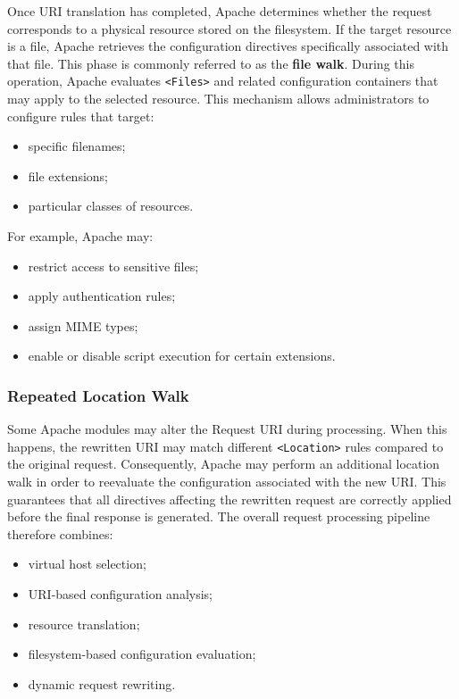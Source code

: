 \documentclass{scrbook}
\begin{document}
	Once URI translation has completed, Apache determines whether the request corresponds to a physical resource stored on the filesystem. If the target resource is a file, Apache retrieves the configuration directives specifically associated with that file. This phase is commonly referred to as the \textbf{file walk}. During this operation, Apache evaluates \texttt{<Files>} and related configuration containers that may apply to the selected resource. This mechanism allows administrators to configure rules that target:
	\begin{itemize}
		\item
		specific filenames;
		
		\item
		file extensions;
		
		\item
		particular classes of resources.
	\end{itemize}
	
	For example, Apache may:
	\begin{itemize}
		\item
		restrict access to sensitive files;
		
		\item
		apply authentication rules;
		
		\item
		assign MIME types;
		
		\item
		enable or disable script execution for certain extensions.
	\end{itemize}
	
	\subsubsection{Repeated Location Walk}
	
	Some Apache modules may alter the Request URI during processing. When this happens, the rewritten URI may match different \texttt{<Location>} rules compared to the original request. Consequently, Apache may perform an additional location walk in order to reevaluate the configuration associated with the new URI. This guarantees that all directives affecting the rewritten request are correctly applied before the final response is generated. The overall request processing pipeline therefore combines:
	\begin{itemize}
		\item
		virtual host selection;
		
		\item
		URI-based configuration analysis;
		
		\item
		resource translation;
		
		\item
		filesystem-based configuration evaluation;
		
		\item
		dynamic request rewriting.
	\end{itemize}
	
\end{document}
